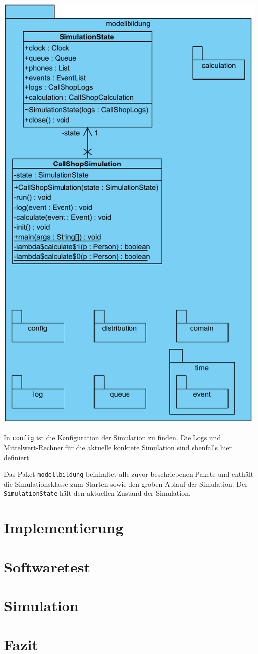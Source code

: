 \includegraphics[scale=0.5]{abbildungen/uml/modellbildung.pdf}

In \texttt{config} ist die Konfiguration der Simulation zu finden. Die Logs und Mittelwert-Rechner für die aktuelle konkrete Simulation sind ebenfalls hier definiert.

Das Paket \texttt{modellbildung} beinhaltet alle zuvor beschriebenen Pakete und enthält die Simulationsklasse zum Starten sowie den groben Ablauf der Simulation. Der \texttt{SimulationState} hält den aktuellen Zustand der Simulation.

\section{Implementierung}

\section{Softwaretest}

\section{Simulation}

\section{Fazit}


